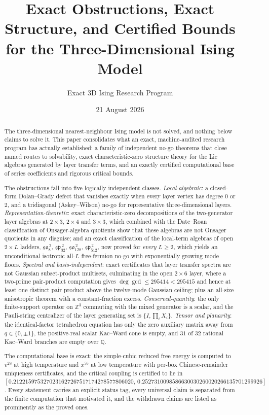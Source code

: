 \documentclass[11pt]{article}
\title{Exact Obstructions, Exact Structure, and Certified Bounds\\
for the Three-Dimensional Ising Model}
\author{Exact 3D Ising Research Program}
\date{21 August 2026}
\theoremstyle{definition}
\newcommand{\Qb}{\mathbb{Q}}
\newcommand{\Zb}{\mathbb{Z}}
\begin{document}
\maketitle

\begin{abstract}
The three-dimensional nearest-neighbour Ising model is not solved, and nothing below claims to solve
it. This paper consolidates what an exact, machine-audited research program has actually established:
a family of independent no-go theorems that close named routes to solvability, exact
characteristic-zero structure theory for the Lie algebras generated by layer transfer terms, and an
exactly certified computational base of series coefficients and rigorous critical bounds.

The obstructions fall into five logically independent classes. \emph{Local-algebraic}: a closed-form
Dolan--Grady defect that vanishes exactly when every layer vertex has degree $0$ or $2$, and a
tridiagonal (Askey--Wilson) no-go for representative three-dimensional layers.
\emph{Representation-theoretic}: exact characteristic-zero decompositions of the two-generator layer
algebras at $2\times3$, $2\times4$ and $3\times3$, which combined with the Date--Roan classification
of Onsager-algebra quotients show that these algebras are not Onsager quotients in any disguise; and
an exact classification of the local-term algebras of open $2\times L$ ladders, $\mathfrak{so}_8^{\,2}$,
$\mathfrak{sp}_{32}^{\,2}$, $\mathfrak{so}_{128}^{\,2}$, $\mathfrak{sp}_{512}^{\,2}$, now proved for
\emph{every} $L\ge2$, which yields an unconditional isotropic all-$L$ free-fermion no-go with
exponentially growing mode floors. \emph{Spectral and basis-independent}: exact certificates
that layer transfer spectra are not Gaussian subset-product multisets, culminating in the open
$2\times6$ layer, where a two-prime pair-product computation gives
$\deg\gcd \le 295414 < 295415$ and hence at least one distinct pair product above the twelve-mode
Gaussian ceiling; plus an all-size anisotropic theorem with a constant-fraction excess.
\emph{Conserved-quantity}: the only finite-support operator on $\Zb^3$ commuting with the mixed
generator is a scalar, and the Pauli-string centralizer of the layer generating set is
$\{I,\prod_i X_i\}$. \emph{Tensor and planarity}: the identical-factor tetrahedron equation has only
the zero auxiliary matrix away from $q\in\{0,\pm1\}$, the positive-real scalar Kac--Ward cone is
empty, and $31$ of $32$ rational Kac--Ward branches are empty over $\Qb$.

The computational base is exact: the simple-cubic reduced free energy is computed to $v^{28}$ at high
temperature and $x^{56}$ at low temperature with per-box Chinese-remainder uniqueness certificates,
and the critical coupling is certified to lie in
$[0.2122159753270231627267517174278577806020,\,0.2527310098586630030260020266135701299926]$.
Every statement carries an explicit status tag, every universal claim is separated from the finite
computation that motivated it, and the withdrawn claims are listed as prominently as the proved ones.
\end{abstract}
\end{document}
